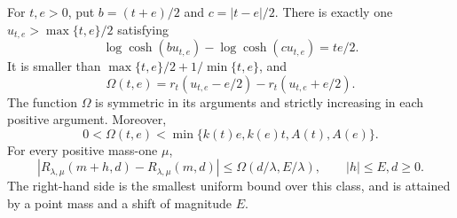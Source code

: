 \begin{theorem}
\label{thm:sharp-finite-common-shift}
For $t,e>0$, put $b=(t+e)/2$ and $c=|t-e|/2$. There is exactly one
$u_{t,e}>\max\{t,e\}/2$ satisfying
\begin{equation}
 \log\cosh(bu_{t,e})-\log\cosh(cu_{t,e})=te/2.
 \label{eq:sharp-Omega-root}
\end{equation}
It is smaller than $\max\{t,e\}/2+1/\min\{t,e\}$, and
\begin{equation}
 \Omega(t,e)=r_t(u_{t,e}-e/2)-r_t(u_{t,e}+e/2).
 \label{eq:sharp-Omega-evaluation}
\end{equation}
The function $\Omega$ is symmetric in its arguments and strictly
increasing in each positive argument. Moreover,
\begin{equation}
 0<\Omega(t,e)<\min\{k(t)e,k(e)t,A(t),A(e)\}.
 \label{eq:sharp-Omega-comparison}
\end{equation}
For every positive mass-one $\mu$,
\begin{equation}
 |R_{\lambda,\mu}(m+h,d)-R_{\lambda,\mu}(m,d)|
 \leq\Omega(d/\lambda,E/\lambda),\qquad |h|\leq E, d\geq0.
 \label{eq:sharp-Omega-mixture}
\end{equation}
The right-hand side is the smallest uniform bound over this class,
and is attained by a point mass and a shift of magnitude $E$.
\end{theorem}
